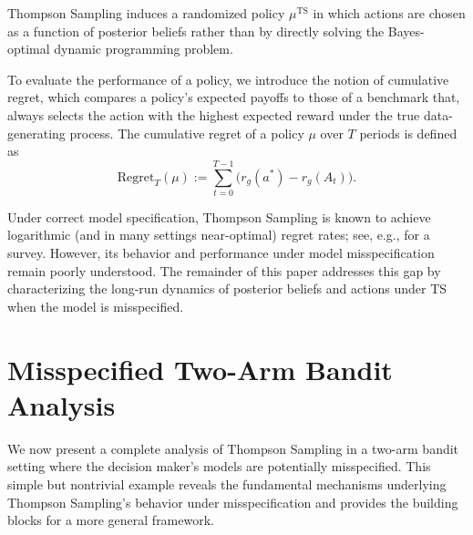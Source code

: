 \documentclass[12pt]{article}
\begin{document}
Thompson Sampling induces a randomized policy $\mu^{\mathrm{TS}}$ in which actions are chosen as a function of posterior beliefs rather than by directly solving the Bayes-optimal dynamic programming problem.

\vspace{1em}

\begin{algorithm}[H]
\SetAlgoLined
\DontPrintSemicolon
\caption{Thompson Sampling}
\label{Algorithm:TS}


\end{algorithm}
\vspace{1em}

To evaluate the performance of a policy, we introduce the notion of cumulative regret, which compares a policy's expected payoffs to those
of a benchmark that, always selects the action with the highest expected reward under the true data-generating process. The cumulative regret of a policy $\mu$ over $T$ periods is defined as
\begin{equation}\label{eq:regret}
\mathrm{Regret}_T(\mu)
:= \sum_{t=0}^{T-1} \bigl( r_g(a^*) - r_g(A_t) \bigr).
\end{equation}

Under correct model specification, Thompson Sampling is known to achieve logarithmic (and in many settings near-optimal) regret rates; see, e.g., \citet{russoTutorialThompsonSampling2020} for a survey. However, its behavior and performance under model misspecification remain poorly understood. The remainder of this paper addresses this gap by characterizing the long-run dynamics of posterior beliefs and actions under TS when the model is misspecified.

\section{Misspecified Two-Arm Bandit Analysis}

We now present a complete analysis of Thompson Sampling in a two-arm bandit setting where the decision maker's models are potentially misspecified. This simple but nontrivial example reveals the fundamental mechanisms underlying Thompson Sampling's behavior under misspecification and provides the building blocks for a more general framework.
\end{document}
